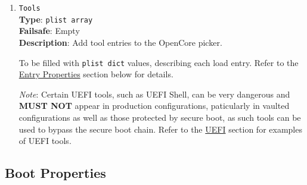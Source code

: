 \documentclass[]{article}
\begin{document}
\begin{enumerate}
\item
  \texttt{Tools}\label{misctools}\\
  \textbf{Type}: \texttt{plist\ array}\\
  \textbf{Failsafe}: Empty\\
  \textbf{Description}: Add tool entries to the OpenCore picker.

  To be filled with \texttt{plist\ dict} values, describing each load entry.
  Refer to the \hyperref[miscentryprops]{Entry Properties} section below for details.

  \emph{Note}: Certain UEFI tools, such as UEFI Shell, can be very dangerous and
  \textbf{MUST NOT} appear in production configurations, paticularly in vaulted
  configurations as well as those protected by secure boot, as such tools can be
  used to bypass the secure boot chain.
  Refer to the \hyperref[uefitools]{UEFI} section for examples of UEFI tools.

\end{enumerate}

\subsection{Boot Properties}\label{miscbootprops}
\end{document}

